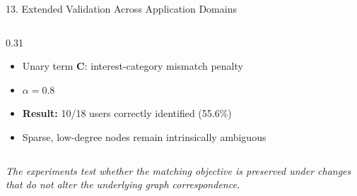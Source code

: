 \documentclass[aspectratio=169, 11pt]{beamer}
\begin{document}
\begin{frame}{13. Extended Validation Across Application Domains}
\begin{columns}[T]
\begin{column}{0.31\textwidth}
\begin{itemize}
\item Unary term $\mathbf{C}$:
interest-category mismatch penalty

\item $\alpha=0.8$

\item \textbf{Result:}
10/18 users correctly identified
(55.6\%)

\item Sparse, low-degree nodes remain
intrinsically ambiguous

\end{itemize}

\end{column}

\end{columns}

\vspace{0.5em}

\centering
\small
\textit{The experiments test whether the matching objective is preserved
under changes that do not alter the underlying graph correspondence.}

\end{frame}


\end{document}
